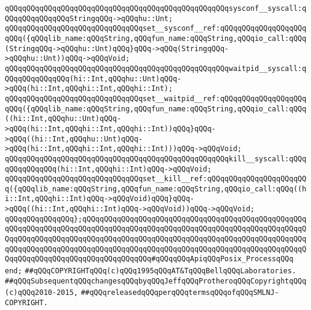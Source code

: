 \newline
\verb|qQQqqQQqqQQqqQQqqQQqqQQqqQQqqQQqqQQqqQQqqQQqqQQqqQQqsysconf__syscall:qQQqqQQqqQQqqQQqStringqQQq->qQQqhu::Unt;|\newline
\verb|qQQqqQQqqQQqqQQqqQQqqQQqqQQqqQQqset__sysconf__ref:qQQqqQQqqQQqqQQqqQQqqQQq({qQQqlib_name:qQQqString,qQQqfun_name:qQQqString,qQQqio_call:qQQq(StringqQQq->qQQqhu::Unt)qQQq}qQQq->qQQq(StringqQQq->qQQqhu::Unt))qQQq->qQQqVoid;|\newline
\newline
\verb|qQQqqQQqqQQqqQQqqQQqqQQqqQQqqQQqqQQqqQQqqQQqqQQqqQQqwaitpid__syscall:qQQqqQQqqQQqqQQq(hi::Int,qQQqhu::Unt)qQQq->qQQq(hi::Int,qQQqhi::Int,qQQqhi::Int);|\newline
\verb|qQQqqQQqqQQqqQQqqQQqqQQqqQQqqQQqset__waitpid__ref:qQQqqQQqqQQqqQQqqQQqqQQq({qQQqlib_name:qQQqString,qQQqfun_name:qQQqString,qQQqio_call:qQQq((hi::Int,qQQqhu::Unt)qQQq->qQQq(hi::Int,qQQqhi::Int,qQQqhi::Int))qQQq}qQQq->qQQq((hi::Int,qQQqhu::Unt)qQQq->qQQq(hi::Int,qQQqhi::Int,qQQqhi::Int)))qQQq->qQQqVoid;|\newline
\newline
\verb|qQQqqQQqqQQqqQQqqQQqqQQqqQQqqQQqqQQqqQQqqQQqqQQqqQQqkill__syscall:qQQqqQQqqQQqqQQq(hi::Int,qQQqhi::Int)qQQq->qQQqVoid;|\newline
\verb|qQQqqQQqqQQqqQQqqQQqqQQqqQQqqQQqset__kill__ref:qQQqqQQqqQQqqQQqqQQqqQQq({qQQqlib_name:qQQqString,qQQqfun_name:qQQqString,qQQqio_call:qQQq((hi::Int,qQQqhi::Int)qQQq->qQQqVoid)qQQq}qQQq->qQQq((hi::Int,qQQqhi::Int)qQQq->qQQqVoid))qQQq->qQQqVoid;|\newline
\verb|qQQqqQQqqQQqqQQq};qQQqqQQqqQQqqQQqqQQqqQQqqQQqqQQqqQQqqQQqqQQqqQQqqQQqqQQqqQQqqQQqqQQqqQQqqQQqqQQqqQQqqQQqqQQqqQQqqQQqqQQqqQQqqQQqqQQqqQQqqQQqqQQqqQQqqQQqqQQqqQQqqQQqqQQqqQQqqQQqqQQqqQQqqQQqqQQqqQQqqQQqqQQqqQQqqQQqqQQqqQQqqQQqqQQqqQQqqQQqqQQqqQQqqQQqqQQqqQQqqQQqqQQqqQQqqQQqqQQqqQQqqQQqqQQqqQQqqQQqqQQqqQQqqQQqqQQq#qQQqqQQqApiqQQqPosix_ProcessqQQq|\newline
\verb|end;|\newline
\newline
\newline
\verb|##qQQqCOPYRIGHTqQQq(c)qQQq1995qQQqAT&TqQQqBellqQQqLaboratories.|\newline
\verb|##qQQqSubsequentqQQqchangesqQQqbyqQQqJeffqQQqProtheroqQQqCopyrightqQQq(c)qQQq2010-2015,|\newline
\verb|##qQQqreleasedqQQqperqQQqtermsqQQqofqQQqSMLNJ-COPYRIGHT.|\newline

